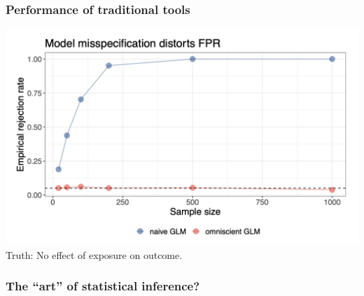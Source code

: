 \documentclass[t]{beamer}
\begin{document}
\begin{frame}
\frametitle{Performance of traditional tools}
\vspace{5pt}
\centering
\includegraphics[width=1.0\textwidth]{figures/fpr_bst258.png}
\vspace{0.5em}
Truth: No effect of exposure on outcome.
\end{frame}


\begin{frame}
\frametitle{The ``art'' of statistical inference?}
\vspace{-.2in}
\centering
\begin{figure}
\end{figure}
\end{frame}
\end{document}

